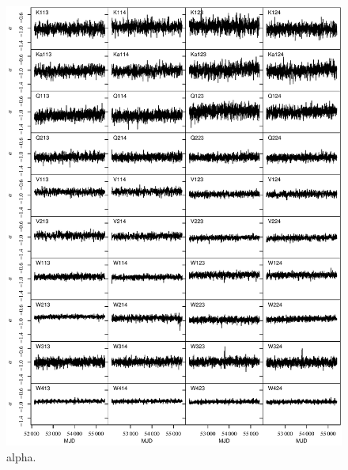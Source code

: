 \documentclass[twocolumn]{../../common/aa}
\begin{document}
\begin{figure}[p]
	\centering
	\includegraphics[width=\textwidth]{figures/instpar_CG_alpha_v1.pdf}
	\caption{alpha.}
	\label{fig:alpha}
\end{figure}
\end{document}
